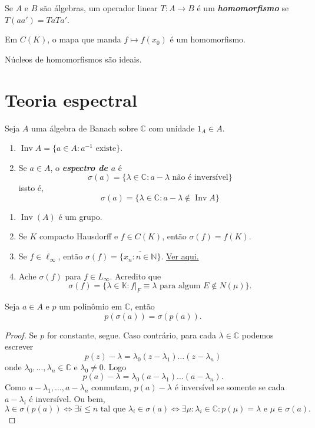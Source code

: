 \documentclass[portuguese]{article}
\theoremstyle{definition}
\newcommand{\N}{\mathbb{N}}
\newcommand{\C}{\mathbb{C}}
\begin{document}
\begin{defn}
	Se $A$ e $B$ são álgebras, um operador linear $T:A\to B$ é um \textbf{\textit{homomorfismo}} se $T(aa')=TaTa'$.
\end{defn}
\begin{exemplo}
	Em $C(K)$, o mapa que manda $f\mapsto f(x_0)$ é um homomorfismo.
\end{exemplo}
\begin{obs}
	Núcleos de homomorfismos são ideais.
\end{obs}
\section{Teoria espectral}
\begin{defn}
	Seja $A$ uma álgebra de Banach sobre $\C$ com unidade $1_A\in A$.
	\begin{enumerate}
		\item $\operatorname{Inv}A=\{a\in A:a^{-1}\text{ existe}\}$.
		\item Se $a\in A$, o \textbf{\textit{espectro de $a$}} é
		\[\sigma(a)=\{\lambda\in\C:a-\lambda\text{ não é inversível}\}\]
		issto é,
		\[\sigma(a)=\{\lambda\in\C:a-\lambda\notin\operatorname{Inv}A\}\]
	\end{enumerate}
\end{defn}
\begin{exemplos}\leavevmode
	\begin{enumerate}
		\item $\operatorname{Inv}(A)$ é um grupo.
		\item Se $K$ compacto Hausdorff e $f\in C(K)$, então $\sigma (f)=f(K)$.
		\item Se $f\in\ell_\infty$, então $\sigma(f)=\overline{\{x_n:n\in\N\}}$. \href{https://math.stackexchange.com/questions/3077283/finding-the-spectrum-of-an-element-of-ell-infty}{Ver aqui.}
		\item {\color{orange} Ache $\sigma (f)$ para $f\in L_\infty$.} {\color{persiangreen}Acredito que \[\sigma(f)=\{\lambda\in\mathbb{K}:f|_F\equiv \lambda\text{ para algum }E\notin N(\mu)\}.\]}
	\end{enumerate}
\end{exemplos}
\begin{prop}
	Seja $a\in A$ e $p$ um polinômio em $\C$, então
	\[p(\sigma(a))=\sigma(p(a)).\]
\end{prop}
\begin{proof}
	Se $p$ for constante, segue. Caso contrário, para cada $\lambda\in\C$ podemos escrever
	\[p(z)-\lambda=\lambda_0(z-\lambda_1)\ldots(z-\lambda_n)\]
	onde $\lambda_0,\ldots,\lambda_n\in\C$ e $\lambda_0\neq0$.
	Logo
	\[p(a)-\lambda=\lambda_0(a-\lambda_1)\ldots(a-\lambda_n).\]
	Como $a-\lambda_1,\ldots,a-\lambda_n$ conmutam, $p(a)-\lambda$ é inversível se somente se cada $a-\lambda_i$ é inversível. Ou bem,
	\[\lambda\in\sigma(p(a))\iff\exists i\leq n\text{ tal que } \lambda_i\in\sigma(a)\iff\exists\mu:\lambda_i\in\C:p(\mu)=\lambda\text{ e }\mu\in\sigma(a).\]
\end{proof}
\end{document}

